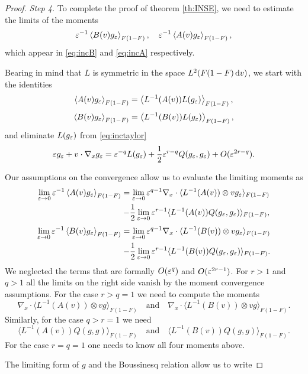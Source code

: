 \begin{proof}
\textit{Step 4.}
To complete the proof of theorem \ref{th:INSE}, we need to estimate the limits of the moments
\[{\varepsilon}^{-1} 
\left\langle B(v)g_{\varepsilon}\right\rangle_{F(1-F)},\quad {\varepsilon}^{-1} 
\left\langle A(v)g_{\varepsilon}\right\rangle_{F(1-F)},\]
which appear in \eqref{eq:incB} and \eqref{eq:incA} respectively.

Bearing in mind that $L$ is symmetric in the space $L^2(F(1-F){\,\mathrm{d} v})$, we start with the identities
\[\left\langle A(v)g_{\varepsilon}\right\rangle_{F(1-F)}=\left\langle
L^{-1}(A(v))L(g_{\varepsilon})\right\rangle_{F(1-F)},\]
\[\left\langle B(v)g_{\varepsilon}\right\rangle_{F(1-F)}=\left\langle
L^{-1}(B(v))L(g_{\varepsilon})\right\rangle_{F(1-F)},\]
and eliminate $L(g_{\varepsilon})$ from \eqref{eq:inctaylor}
\[{\varepsilon} g_{\varepsilon} + v\cdot \nabla_xg_{\varepsilon} =
{\varepsilon}^{-q}L(g_{\varepsilon})+\frac 12
{\varepsilon}^{r-q}Q(g_{\varepsilon},g_{\varepsilon})+O({\varepsilon}^{2r-q}).\]

Our assumptions on the convergence allow us to evaluate the limiting moments as
\[\begin{split}
   \lim\limits_{{\varepsilon}\to 0}{\varepsilon}^{-1} 
\left\langle A(v)g_{\varepsilon}\right\rangle_{F(1-F)}=\lim\limits_{{\varepsilon}\to
0} {\varepsilon}^{q-1}\nabla_x \cdot\langle  L^{-1}(A(v))\otimes v
g_{\varepsilon}\rangle_{F(1-F)}\\
-\frac 12 \lim\limits_{{\varepsilon}\to 0} {\varepsilon}^{r-1} \langle  L^{-1}(A(v)) Q
(g_{\varepsilon},g_{\varepsilon})\rangle_{F(1-F)},
  \end{split}
\]
\[\begin{split}
   \lim\limits_{{\varepsilon}\to 0}{\varepsilon}^{-1} 
\left\langle B(v)g_{\varepsilon}\right\rangle_{F(1-F)}=\lim\limits_{{\varepsilon}\to
0} {\varepsilon}^{q-1}\nabla_x \cdot\langle L^{-1}(B(v))\otimes
vg_{\varepsilon}\rangle_{F(1-F)}\\
-\frac 12 \lim\limits_{{\varepsilon}\to 0} {\varepsilon}^{r-1} \langle  L^{-1}(B(v)) Q
(g_{\varepsilon},g_{\varepsilon})\rangle_{F(1-F)}.
  \end{split}
\]
We neglected the terms that are formally $O({\varepsilon}^{q})$ and
$O({\varepsilon}^{2r-1})$. For $r>1$ and $q>1$ all the limits on the right side
vanish by the moment convergence assumptions. For the case $r>q=1$ we need to
compute the moments
\[ \nabla_x \cdot\langle  L^{-1}(A(v))\otimes vg \rangle_{F(1-F)} \quad \text{and}\quad
\nabla_x \cdot\langle  L^{-1}(B(v))\otimes vg%
\rangle_{F(1-F)}.\]
Similarly, for the case $q>r=1$ we need 
\[ \langle  L^{-1}(A(v)) Q (g ,g )\rangle_{F(1-F)}\quad \text{and}\quad \langle  L^{-1}(B(v)) Q
(g ,g )\rangle_{F(1-F)}. \]
For the case $r=q=1$ one needs to know all four moments above.

The limiting form of $g$ and the Boussinesq relation allow us to write


\end{proof}
